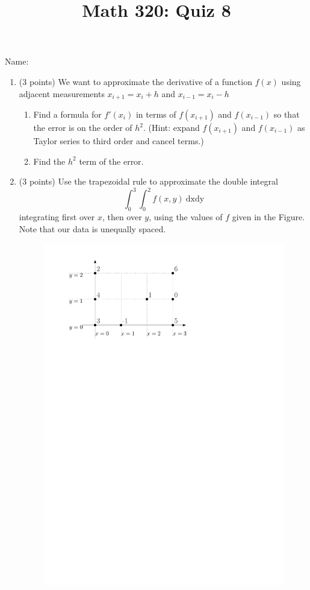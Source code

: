 \documentclass[12pt]{amsart}
\begin{document}
\flushright
Name:\underline{\hspace{5cm}}
\title{Math 320: Quiz 8}
\maketitle

\begin{enumerate}

\item (3 points) We want to approximate the derivative of
a function $f(x)$ using adjacent measurements $x_{i+1} = x_i + h$ and
$x_{i-1} = x_i - h$
\begin{enumerate} \item Find a formula for $f'(x_i)$ in terms of
$f(x_{i+1})$ and $f(x_{i-1})$ so that the error is on the order
of $h^2$.  (Hint: expand $f(x_{i+1})$ and 
$f(x_{i-1})$ as Taylor series to third order and cancel terms.)

\item Find the $h^2$ term of the error.
\end{enumerate}

\vfill
\pagebreak

\item (3 points) Use the trapezoidal rule to approximate the double
integral \[ \int_0^3 \int_0^2 f(x,y) \: \mathrm{dx} \mathrm{dy}\] integrating first over $x$, then over $y$, using the values of $f$ given in the Figure. Note that our data is unequally spaced.


\begin{figure}[h!]
\includegraphics[width = .6\textwidth]{double.pdf}
\label{fig:double}
\end{figure}
\vfill
\pagebreak


\end{enumerate}
\end{document}
